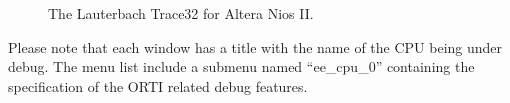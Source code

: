 %
\begin{figure}
\caption{\label{fig:trace32_splash} The Lauterbach Trace32 for Altera Nios II.}
\end{figure}
%

Please note that each window has a title
with the name of the CPU being under debug. The menu list include a
submenu named ``ee\_cpu\_0'' containing the specification of the ORTI
related debug features.

